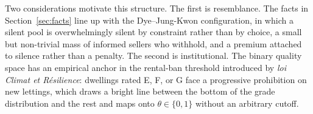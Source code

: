 Two considerations motivate this structure. The first is resemblance. The facts in
Section~\ref{sec:facts} line up with the Dye--Jung-Kwon configuration, in which a silent pool is
overwhelmingly silent by constraint rather than by choice, a small but non-trivial mass of
informed sellers who withhold, and a premium attached to silence rather than a penalty. The
second is institutional. The binary quality space has an empirical anchor in the rental-ban
threshold introduced by \emph{loi Climat et R\'esilience}: dwellings rated E, F, or G face a
progressive prohibition on new lettings, which draws a bright line between the bottom of the
grade distribution and the rest and maps onto $\theta\in\{0,1\}$ without an arbitrary cutoff.
